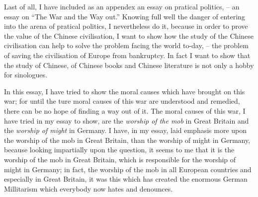 Last of all, I have included as an appendex an essay on pratical politics,
-- an essay on ``The War and the Way out.''
Knowing full well the danger of entering into the arena of pratical politics,
    I nevertheless do it, because in order to prove the value of the Chinese civilisation, I want to show how the study of the Chinese civilisation can help to solve the problem facing the world to-day, -- the problem of saving the civilisation of Europe from bankruptcy.
In fact I want to show that the study of Chinese, of Chinese books and Chinese literature is not only a hobby for sinologues.

In this essay, I have tried to show the moral causes which have brought on this war;
for until the ture moral causes of this war are understood and remedied,
there can be no hope of finding a way out of it.
The moral causes of this war, I have tried in my essay to show, are the \emph{worship of the mob} in Great Britain and the \emph{worship of might} in Germany.
I have, in my essay, laid emphasis more upon the worship of the mob in Great Britain, than the worship of might in Germany,
because looking impartially upon the question, it seems to me that it is the worship of the mob in Great Britain, which is responsible for the worship of might in Germany;
in fact, the worship of the mob in all European countries and especially in Great Britain,
it was this which has created the enormous German Millitarism which everybody now hates and denounces.

